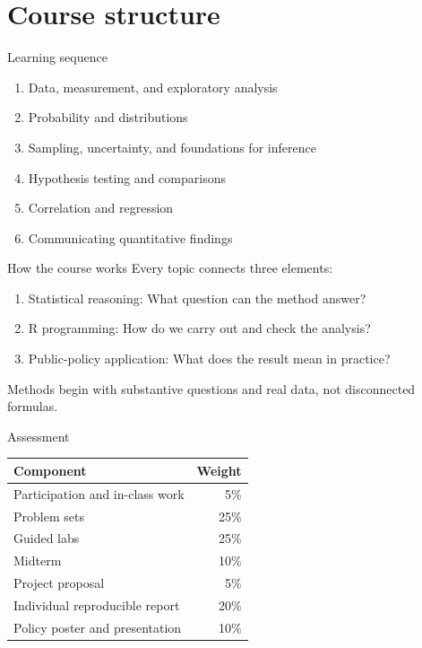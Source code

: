 \documentclass[11pt,aspectratio=169]{beamer}
\begin{document}
\section{Course structure}

\begin{frame}{Learning sequence}
\begin{enumerate}
  \item Data, measurement, and exploratory analysis
  \item Probability and distributions
  \item Sampling, uncertainty, and foundations for inference
  \item Hypothesis testing and comparisons
  \item Correlation and regression
  \item Communicating quantitative findings
\end{enumerate}
\end{frame}

\begin{frame}{How the course works}
Every topic connects three elements:
\begin{enumerate}
  \item \alert{Statistical reasoning}: What question can the method answer?
  \item \alert{R programming}: How do we carry out and check the analysis?
  \item \alert{Public-policy application}: What does the result mean in practice?
\end{enumerate}
\vspace{0.4em}
Methods begin with substantive questions and real data, not disconnected formulas.
\end{frame}

\begin{frame}{Assessment}
\begin{center}
\begin{tabular}{lr}
\toprule
Component & Weight \\
\midrule
Participation and in-class work & 5\% \\
Problem sets & 25\% \\
Guided labs & 25\% \\
Midterm & 10\% \\
Project proposal & 5\% \\
Individual reproducible report & 20\% \\
Policy poster and presentation & 10\% \\
\bottomrule
\end{tabular}
\end{center}
\end{frame}
\end{document}
